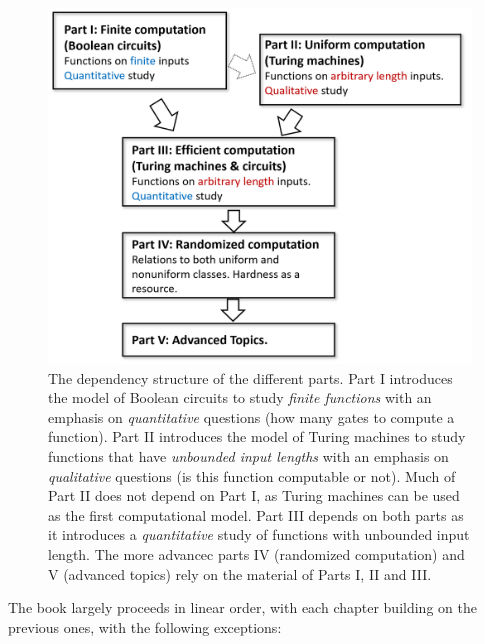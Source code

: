 \begin{figure}
\centering
\includegraphics[width=\textwidth, height=0.25\paperheight, keepaspectratio]{../figure/dependencystructure.png}
\caption{The dependency structure of the different parts. Part I
introduces the model of Boolean circuits to study \emph{finite
functions} with an emphasis on \emph{quantitative} questions (how many
gates to compute a function). Part II introduces the model of Turing
machines to study functions that have \emph{unbounded input lengths}
with an emphasis on \emph{qualitative} questions (is this function
computable or not). Much of Part II does not depend on Part I, as Turing
machines can be used as the first computational model. Part III depends
on both parts as it introduces a \emph{quantitative} study of functions
with unbounded input length. The more advancec parts IV (randomized
computation) and V (advanced topics) rely on the material of Parts I, II
and III.}
\label{dependencystructurefig}
\end{figure}

The book largely proceeds in linear order, with each chapter building on
the previous ones, with the following exceptions:

